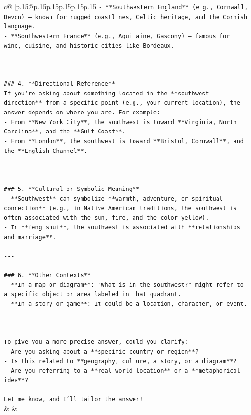 \documentclass{article}
\begin{document}
{\begin{supertabular}{c@{$\;$}|p{.15\linewidth}@{}p{.15\linewidth}p{.15\linewidth}p{.15\linewidth}p{.15\linewidth}p{.15\linewidth}}
{{{\texttt{{-} **Southwestern England** (e.g., Cornwall, Devon) — known for rugged coastlines, Celtic heritage, and the Cornish language.} \\
\texttt{{-} **Southwestern France** (e.g., Aquitaine, Gascony) — famous for wine, cuisine, and historic cities like Bordeaux.} \\
\\ 
\texttt{{-}{-}{-}} \\
\\ 
\texttt{\#\#\# 4. **Directional Reference**} \\
\texttt{If you're asking about something located in the **southwest direction** from a specific point (e.g., your current location), the answer depends on where you are. For example:} \\
\texttt{{-} From **New York City**, the southwest is toward **Virginia, North Carolina**, and the **Gulf Coast**.} \\
\texttt{{-} From **London**, the southwest is toward **Bristol, Cornwall**, and the **English Channel**.} \\
\\ 
\texttt{{-}{-}{-}} \\
\\ 
\texttt{\#\#\# 5. **Cultural or Symbolic Meaning**} \\
\texttt{{-} **Southwest** can symbolize **warmth, adventure, or spiritual connection** (e.g., in Native American traditions, the southwest is often associated with the sun, fire, and the color yellow).} \\
\texttt{{-} In **feng shui**, the southwest is associated with **relationships and marriage**.} \\
\\ 
\texttt{{-}{-}{-}} \\
\\ 
\texttt{\#\#\# 6. **Other Contexts**} \\
\texttt{{-} **In a map or diagram**: "What is in the southwest?" might refer to a specific object or area labeled in that quadrant.} \\
\texttt{{-} **In a story or game**: It could be a location, character, or event.} \\
\\ 
\texttt{{-}{-}{-}} \\
\\ 
\texttt{To give you a more precise answer, could you clarify:} \\
\texttt{{-} Are you asking about a **specific country or region**?} \\
\texttt{{-} Is this related to **geography, culture, a story, or a diagram**?} \\
\texttt{{-} Are you referring to a **real{-}world location** or a **metaphorical idea**?} \\
\\ 
\texttt{Let me know, and I’ll tailor the answer!} \\
            }
        }
    }
    & & \\ \\


\end{supertabular}}
\end{document}
